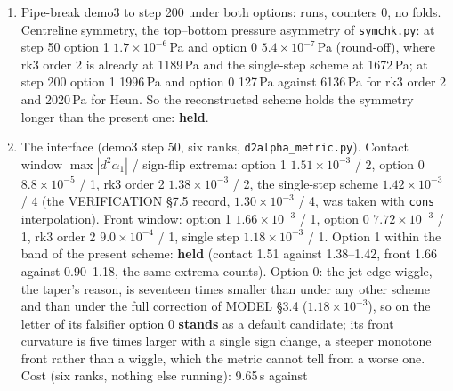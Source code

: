 \documentclass[11pt,a4paper]{article}
\newcommand{\code}[1]{\texttt{\small #1}}
\begin{document}
\begin{enumerate}[nosep]
      y) agree to $8\times10^{-16}$; the mirrored pairs to
      $6.3\times10^{-12}$, above the suite's $10^{-12}$ tolerance and the
      $8.7\times10^{-14}$ of the order-2 record: \textbf{refuted at
      tolerance}, and not a coding asymmetry: at step 1 the mirror is exact
      (0 in every field) and at step 20 it is $6\times10^{-15}$ (order 2:
      $9\times10^{-14}$); the less dissipative scheme lets the round-off
      difference grow faster over 300 steps.  The AMR tube
      (\code{inputs-x-amr}, 300 coarse steps): runs under both options,
      mass drift $2\times10^{-16}$, \code{recon\_fallback} 0; option 0
      takes 304 vacuum folds over the run, option 1 and the control none.
\item Pipe-break demo3 to step 200 under both options: runs, counters 0,
      no folds.  Centreline symmetry, the top--bottom pressure asymmetry of
      \code{symchk.py}: at step 50 option 1 $1.7\times10^{-6}$\,Pa and
      option 0 $5.4\times10^{-7}$\,Pa (round-off), where rk3 order 2 is
      already at 1189\,Pa and the single-step scheme at 1672\,Pa; at step
      200 option 1 1996\,Pa and option 0 127\,Pa against 6136\,Pa for rk3 order 2 and 2020\,Pa for Heun.  So the
      reconstructed scheme holds the symmetry longer than the present one:
      \textbf{held}.
\item The interface (demo3 step 50, six ranks, \code{d2alpha\_metric.py}).
      Contact window $\max|d^2\alpha_1|$ / sign-flip extrema: option 1
      $1.51\times10^{-3}$ / 2, option 0 $8.8\times10^{-5}$ / 1, rk3 order 2
      $1.38\times10^{-3}$ / 2, the single-step scheme $1.42\times10^{-3}$
      / 4 (the VERIFICATION \S7.5 record, $1.30\times10^{-3}$ / 4, was
      taken with \code{cons} interpolation).  Front window: option 1
      $1.66\times10^{-3}$ / 1, option 0 $7.72\times10^{-3}$ / 1, rk3 order
      2 $9.0\times10^{-4}$ / 1, single step $1.18\times10^{-3}$ / 1.
      Option 1 within the band of the present scheme: \textbf{held}
      (contact 1.51 against 1.38--1.42, front 1.66 against 0.90--1.18,
      the same extrema counts).  Option 0: the jet-edge wiggle, the
      taper's reason, is seventeen times smaller than under any other
      scheme and than under the full correction of MODEL \S3.4
      ($1.18\times10^{-3}$), so on the letter of its falsifier option 0
      \textbf{stands} as a default candidate; its front curvature is
      five times larger with a single sign change, a steeper monotone
      front rather than a wiggle, which the metric cannot tell from a
      worse one.  Cost (six ranks, nothing else running): 9.65\,s against

\end{enumerate}
\end{document}
